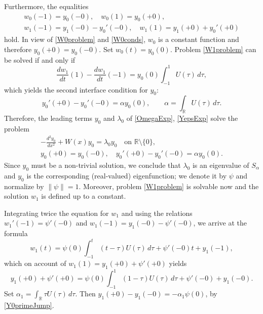\documentclass[reqno]{amsart}
\theoremstyle{definition}
\theoremstyle{remark}
\numberwithin{equation}{section}
\newcommand{\Real}{\mathbb R}
\begin{document}
Furthermore, the equalities
\begin{gather}\label{W0conds}
  w_0(-1)=y_0(-0), \quad w_0(1)=y_0(+0),
\\\label{W1conds}
w_1(-1)=y_1(-0)-y_0'(-0), \quad w_1(1)=y_1(+0)+y_0'(+0)
\end{gather}
hold. In view of \eqref{W0problem} and \eqref{W0conds}, $w_0$ is a constant function and therefore $y_0(+0)=y_0(-0)$.
Set $w_0(t)=y_0(0)$.  Problem \eqref{W1problem} can be solved if and only if
\begin{equation*}
  \frac{d w_1}{dt}(1)-\frac{d w_1}{dt}(-1)=y_0(0)\int_{-1}^1U(\tau)\,d\tau,
\end{equation*}
which yields the second interface condition for $y_0$:
\begin{equation}\label{Y0primeJump}
    y_0'(+0)-y_0'(-0)=\alpha y_0(0),\qquad \alpha=\int_\Real U(\tau)\,d\tau.
\end{equation}
Therefore, the leading terms $y_0$ and $\lambda_0$ of \eqref{OmegaExp}, \eqref{YepsExp} solve the problem
\begin{equation*}
\begin{gathered}
  -\frac{d^2y_0}{dx^2}+W(x)y_0=\lambda_0 y_0\quad\text{on }\Real\setminus\{0\},\\
  y_0(+0)=y_0(-0), \quad y_0'(+0)-y_0'(-0)=\alpha y_0(0).
\end{gathered}
\end{equation*}
Since $y_0$ must be a non-trivial solution, we conclude that $\lambda_0$ is an eigenvalue of $S_\alpha$ and $y_0$ is the corresponding (real-valued) eigenfunction; we denote it by $\psi$ and normalize by $\|\psi\|=1$.
Moreover, problem \eqref{W1problem} is solvable now and the solution $w_1$ is defined up to a constant.

Integrating twice the equation for $w_1$ and using the relations $w_1'(-1) = \psi'(-0)$ and $w_1(-1) = y_1(-0) - \psi'(-0)$, we arrive at the formula
\begin{equation}\label{W1}
	w_1(t)=\psi(0)\int_{-1}^t(t-\tau)U(\tau)\,d\tau + \psi'(-0)t + y_1(-1),
\end{equation}
which on account of $w_1(1)=y_1(+0) + \psi'(+0) $ yields
\begin{equation*}
y_1(+0) + \psi'(+0) = \psi(0)\int_{-1}^1(1-\tau)U(\tau)\,d\tau + \psi'(-0) + y_1(-0).
\end{equation*}
Set $\alpha_1=\int_\Real\tau U(\tau)\,d\tau$. Then $ y_1(+0)-y_1(-0)=-\alpha_1\psi(0)$, by \eqref{Y0primeJump}.
\end{document}

